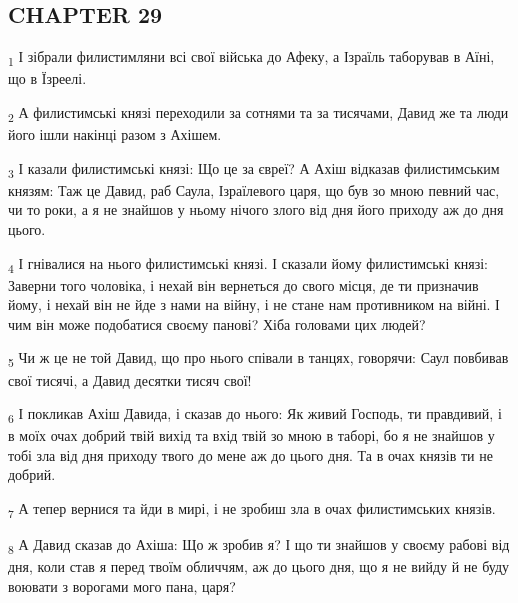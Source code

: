 \subsection{CHAPTER 29}
\begin{tcolorbox}
\textsubscript{1} І зібрали филистимляни всі свої війська до Афеку, а Ізраїль таборував в Аїні, що в Їзреелі.
\end{tcolorbox}
\begin{tcolorbox}
\textsubscript{2} А филистимські князі переходили за сотнями та за тисячами, Давид же та люди його ішли накінці разом з Ахішем.
\end{tcolorbox}
\begin{tcolorbox}
\textsubscript{3} І казали филистимські князі: Що це за євреї? А Ахіш відказав филистимським князям: Таж це Давид, раб Саула, Ізраїлевого царя, що був зо мною певний час, чи то роки, а я не знайшов у ньому нічого злого від дня його приходу аж до дня цього.
\end{tcolorbox}
\begin{tcolorbox}
\textsubscript{4} І гнівалися на нього филистимські князі. І сказали йому филистимські князі: Заверни того чоловіка, і нехай він вернеться до свого місця, де ти призначив йому, і нехай він не йде з нами на війну, і не стане нам противником на війні. І чим він може подобатися своєму панові? Хіба головами цих людей?
\end{tcolorbox}
\begin{tcolorbox}
\textsubscript{5} Чи ж це не той Давид, що про нього співали в танцях, говорячи: Саул повбивав свої тисячі, а Давид десятки тисяч свої!
\end{tcolorbox}
\begin{tcolorbox}
\textsubscript{6} І покликав Ахіш Давида, і сказав до нього: Як живий Господь, ти правдивий, і в моїх очах добрий твій вихід та вхід твій зо мною в таборі, бо я не знайшов у тобі зла від дня приходу твого до мене аж до цього дня. Та в очах князів ти не добрий.
\end{tcolorbox}
\begin{tcolorbox}
\textsubscript{7} А тепер вернися та йди в мирі, і не зробиш зла в очах филистимських князів.
\end{tcolorbox}
\begin{tcolorbox}
\textsubscript{8} А Давид сказав до Ахіша: Що ж зробив я? І що ти знайшов у своєму рабові від дня, коли став я перед твоїм обличчям, аж до цього дня, що я не вийду й не буду воювати з ворогами мого пана, царя?
\end{tcolorbox}
